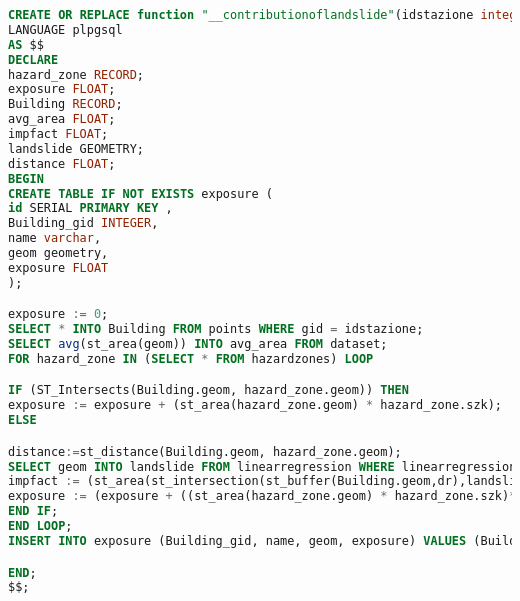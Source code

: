 \begin{lstlisting}[language=SQL]
CREATE OR REPLACE function "__contributionoflandslide"(idstazione integer, dr double precision) returns void
LANGUAGE plpgsql
AS $$
DECLARE
hazard_zone RECORD;
exposure FLOAT;
Building RECORD;
avg_area FLOAT;
impfact FLOAT;
landslide GEOMETRY;
distance FLOAT;
BEGIN
CREATE TABLE IF NOT EXISTS exposure (
id SERIAL PRIMARY KEY ,
Building_gid INTEGER,
name varchar,
geom geometry,
exposure FLOAT
);

exposure := 0;
SELECT * INTO Building FROM points WHERE gid = idstazione;
SELECT avg(st_area(geom)) INTO avg_area FROM dataset;
FOR hazard_zone IN (SELECT * FROM hazardzones) LOOP

IF (ST_Intersects(Building.geom, hazard_zone.geom)) THEN
exposure := exposure + (st_area(hazard_zone.geom) * hazard_zone.szk);
ELSE

distance:=st_distance(Building.geom, hazard_zone.geom);
SELECT geom INTO landslide FROM linearregression WHERE linearregression.id_zone = hazard_zone.id;
impfact := (st_area(st_intersection(st_buffer(Building.geom,dr),landslide)))/(st_area(st_buffer(Building.geom,dr)));
exposure := (exposure + ((st_area(hazard_zone.geom) * hazard_zone.szk)*impfact));
END IF;
END LOOP;
INSERT INTO exposure (Building_gid, name, geom, exposure) VALUES (Building.gid, Building.name, Building.geom, exposure/avg_area);

END;
$$;
\end{lstlisting}